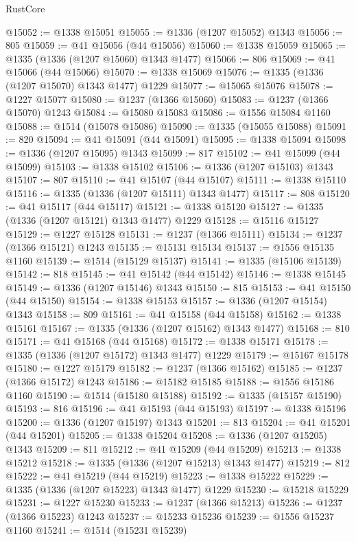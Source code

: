 \begin{lexlean}{RustCore}
\begin{coremodule}
@15052 := @1338 @15051
@15055 := @1336 (@1207 @15052) @1343
@15056 := 805
@15059 := @41 @15056 (@44 @15056)
@15060 := @1338 @15059
@15065 := @1335 (@1336 (@1207 @15060) @1343 @1477)
@15066 := 806
@15069 := @41 @15066 (@44 @15066)
@15070 := @1338 @15069
@15076 := @1335 (@1336 (@1207 @15070) @1343 @1477) @1229
@15077 := @15065 @15076
@15078 := @1227 @15077
@15080 := @1237 (@1366 @15060)
@15083 := @1237 (@1366 @15070) @1243
@15084 := @15080 @15083
@15086 := @1556 @15084 @1160
@15088 := @1514 (@15078 @15086)
@15090 := @1335 (@15055 @15088)
@15091 := 820
@15094 := @41 @15091 (@44 @15091)
@15095 := @1338 @15094
@15098 := @1336 (@1207 @15095) @1343
@15099 := 817
@15102 := @41 @15099 (@44 @15099)
@15103 := @1338 @15102
@15106 := @1336 (@1207 @15103) @1343
@15107 := 807
@15110 := @41 @15107 (@44 @15107)
@15111 := @1338 @15110
@15116 := @1335 (@1336 (@1207 @15111) @1343 @1477)
@15117 := 808
@15120 := @41 @15117 (@44 @15117)
@15121 := @1338 @15120
@15127 := @1335 (@1336 (@1207 @15121) @1343 @1477) @1229
@15128 := @15116 @15127
@15129 := @1227 @15128
@15131 := @1237 (@1366 @15111)
@15134 := @1237 (@1366 @15121) @1243
@15135 := @15131 @15134
@15137 := @1556 @15135 @1160
@15139 := @1514 (@15129 @15137)
@15141 := @1335 (@15106 @15139)
@15142 := 818
@15145 := @41 @15142 (@44 @15142)
@15146 := @1338 @15145
@15149 := @1336 (@1207 @15146) @1343
@15150 := 815
@15153 := @41 @15150 (@44 @15150)
@15154 := @1338 @15153
@15157 := @1336 (@1207 @15154) @1343
@15158 := 809
@15161 := @41 @15158 (@44 @15158)
@15162 := @1338 @15161
@15167 := @1335 (@1336 (@1207 @15162) @1343 @1477)
@15168 := 810
@15171 := @41 @15168 (@44 @15168)
@15172 := @1338 @15171
@15178 := @1335 (@1336 (@1207 @15172) @1343 @1477) @1229
@15179 := @15167 @15178
@15180 := @1227 @15179
@15182 := @1237 (@1366 @15162)
@15185 := @1237 (@1366 @15172) @1243
@15186 := @15182 @15185
@15188 := @1556 @15186 @1160
@15190 := @1514 (@15180 @15188)
@15192 := @1335 (@15157 @15190)
@15193 := 816
@15196 := @41 @15193 (@44 @15193)
@15197 := @1338 @15196
@15200 := @1336 (@1207 @15197) @1343
@15201 := 813
@15204 := @41 @15201 (@44 @15201)
@15205 := @1338 @15204
@15208 := @1336 (@1207 @15205) @1343
@15209 := 811
@15212 := @41 @15209 (@44 @15209)
@15213 := @1338 @15212
@15218 := @1335 (@1336 (@1207 @15213) @1343 @1477)
@15219 := 812
@15222 := @41 @15219 (@44 @15219)
@15223 := @1338 @15222
@15229 := @1335 (@1336 (@1207 @15223) @1343 @1477) @1229
@15230 := @15218 @15229
@15231 := @1227 @15230
@15233 := @1237 (@1366 @15213)
@15236 := @1237 (@1366 @15223) @1243
@15237 := @15233 @15236
@15239 := @1556 @15237 @1160
@15241 := @1514 (@15231 @15239)

\end{coremodule}
\end{lexlean}
